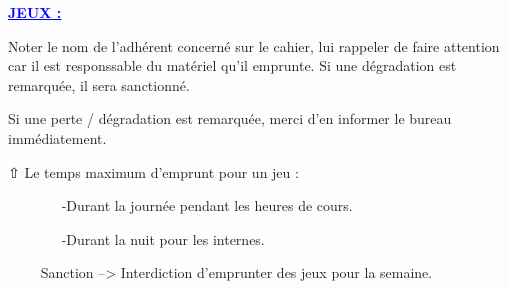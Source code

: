 \documentclass[12pt,a4paper]{article}
\begin{document}
\begin{center}
    \end{center}
    \vspace{0.5 cm}
\begin{Jeux}{\textcolor{blue}{\Large{\underline{\textbf{JEUX :}}}}} \\ \par
{} Noter le nom de l'adhérent concerné sur le cahier, lui rappeler de faire attention car il est responssable du matériel qu'il emprunte. Si une dégradation est remarquée, il sera sanctionné.\par
{} Si une perte / dégradation est remarquée, merci d'en informer le bureau immédiatement.\par
⇧
 Le temps maximum d'emprunt pour un jeu : \par
		~~~~~~~	-Durant la journée pendant les heures de cours.\par
		~~~~~~~	-Durant la nuit pour les internes. \par
~~~~ Sanction --> Interdiction d'emprunter des jeux pour la semaine.\\
\end{Jeux}\\ 
\end{document}
